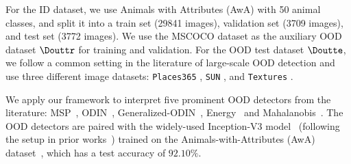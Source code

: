  For the ID dataset, we use Animals with Attributes (AwA) \citep{xian2018awa} with 50 animal classes, and split it into a train set (29841 images), validation set (3709 images), and test set (3772 images).
We use the MSCOCO dataset \citep{lin2014mscoco} as the auxiliary OOD dataset $\Douttr$ for training and validation.
For the OOD test dataset $\Doutte$, we follow a common setting in the literature of large-scale OOD detection \citep{Huang_MOS} and use three different image datasets: \texttt{Places365} \citep{zhou2017places}, \texttt{SUN} \citep{xiao2010sun}, and \texttt{Textures} \citep{cimpoi2014textures}.




We apply our framework to interpret five prominent OOD detectors from the literature: MSP~\citep{hendrycks2016msp}, ODIN~\citep{liang2018ODIN}, Generalized-ODIN~\citep{hsu2020GeneralizedODIN}, Energy~\citep{liu2020energy} and Mahalanobis~\citep{lee2018mahalanobis}.
The OOD detectors are paired with the widely-used Inception-V3 model~\citep{szegedy2016inception-v3} (following the setup in prior works~\citep{yeh2020completeness, ghorbani2019ace, kim2018tcav}) trained on the Animals-with-Attributes (AwA) dataset~\citep{xian2018awa}, which has a test accuracy of $92.10 \%$. 

